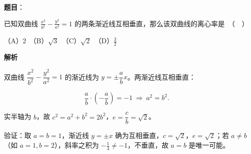 \begin{answer}

\textbf{题目}：

已知双曲线 $\frac{x^2}{b^2} - \frac{y^2}{a^2} = 1$ 的两条渐近线互相垂直，那么该双曲线的离心率是　（　）

（A）$2$　（B）$\sqrt{3}$　（C）$\sqrt{2}$　（D）$\frac{3}{2}$

\textbf{解析}

双曲线 $\dfrac{x^2}{b^2}-\dfrac{y^2}{a^2}=1$ 的渐近线为 $y=\pm\dfrac{a}{b}x$。两渐近线互相垂直：

\nopagebreak[4]
\[\frac{a}{b}\cdot\left(-\frac{a}{b}\right)=-1\ \Longrightarrow\ a^2=b^2 .\]

实半轴为 $b$，故 $c^2=a^2+b^2=2b^2$，$e=\dfrac{c}{b}=\sqrt2$。

验证：取 $a=b=1$，渐近线 $y=\pm x$ 确为互相垂直，$c=\sqrt2$，$e=\sqrt2$；若 $a\ne b$（如 $a=1,b=2$），斜率之积为 $-\tfrac14\ne-1$，不垂直，故 $a=b$ 是唯一可能。


\par\medskip

\end{answer}
